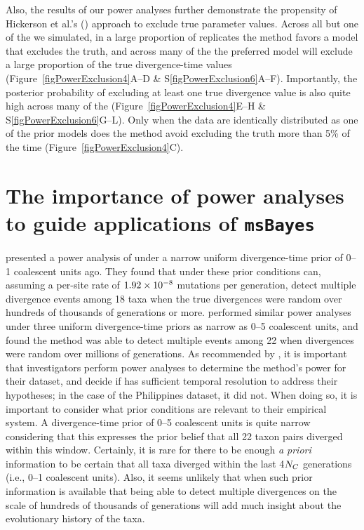 Also, the results of our power analyses further demonstrate the propensity of
Hickerson et al.'s (\citeyear{Hickerson2013}) approach to exclude true
parameter values.
Across all but one of the  we simulated, in a large proportion of
replicates the method favors a model that excludes the truth, and across many
of the  the preferred model will exclude a large proportion of the
true divergence-time values (Figure~\ref{figPowerExclusion4}A--D \&
S\ref{figPowerExclusion6}A--F).
Importantly, the posterior probability of excluding at least one true
divergence value is also quite high across many of the 
(Figure~\ref{figPowerExclusion4}E--H \& S\ref{figPowerExclusion6}G--L).
Only when the data are identically distributed as one of the prior models does
the method avoid excluding the truth more than 5\% of the time
(Figure~\ref{figPowerExclusion4}C).



\section{The importance of power analyses to guide applications of \texttt{msBayes}}
\citet{Hickerson2013} presented a power analysis of \msb under a narrow uniform
divergence-time prior of 0--1 coalescent units ago.
They found that under these prior conditions \msb can, assuming a
per-site rate of $1.92\times 10^{-8}$ mutations per generation, detect multiple
divergence events among 18 taxa when the true divergences were random over
hundreds of thousands of generations or more.
\citet{Oaks2012} performed similar power analyses under three uniform
divergence-time priors as narrow as 0--5 coalescent units, and found the
method was able to detect multiple events among 22 when divergences were random
over millions of generations.
As recommended by \citet{Oaks2012}, it is important that investigators perform
power analyses to determine the method's power for their dataset, and decide if
\msb has sufficient temporal resolution to address their hypotheses; in the
case of the Philippines dataset, it did not.
When doing so, it is important to consider what prior conditions are
relevant to their empirical system.
A divergence-time prior of 0--5 coalescent units is quite narrow considering
that this expresses the prior belief that all 22 taxon pairs diverged within
this window.
Certainly, it is  rare for there to be enough \emph{a priori} information to
be certain that all taxa diverged within the last 4$N_C$ generations
(i.e., 0--1 coalescent units).
Also, it seems unlikely that when such prior information is available that
being able to detect multiple divergences on the scale of hundreds of thousands
of generations will add much insight about the evolutionary history of the
taxa.

